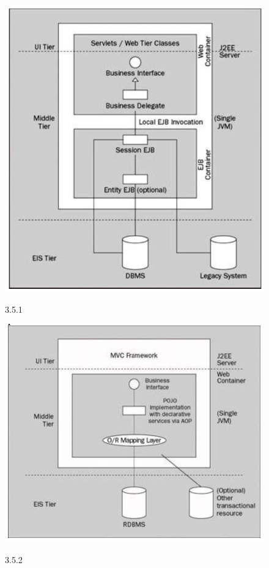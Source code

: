 										\begin{figure}[!htb]
											\includegraphics[width=.8\textwidth]{img5.png}
											\begin{center}
												\figurename{ 3.5.1}
												\end{center}
												\end{figure}
												
												\begin{figure}[!htb]
													\includegraphics[width=.8\textwidth]{img6.png}
													\begin{center}
														\figurename{ 3.5.2}
														\end{center}
														\end{figure}		
														
